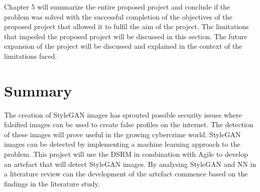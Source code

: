 Chapter 5 will summarize the entire proposed project and conclude if the problem was solved with the successful completion of the objectives of the proposed project that allowed it to fulfil the aim of the project. The limitations that impeded the proposed project will be discussed in this section. The future expansion of the project will be discussed and explained in the context of the limitations faced.

\section{Summary}

The creation of StyleGAN images has sprouted possible security issues where falsified images can be used to create false profiles on the internet. The detection of these images will prove useful in the growing cybercrime world. StyleGAN images can be detected by implementing a machine learning approach to the problem. This project will use the DSRM in combination with Agile to develop an artefact that will detect StyleGAN images. By analysing StyleGAN and NN in a literature review can the development of the artefact commence based on the findings in the literature study.


